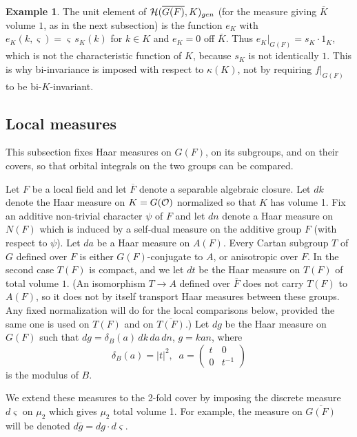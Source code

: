 \documentclass[12pt,letterpaper,openany]{book}
\theoremstyle{plain}
\theoremstyle{definition}
\newtheorem{example}[theorem]{Example}
\theoremstyle{remark}
\theoremstyle{remark}
\begin{document}
\begin{example}
The unit element of ${\cal{H}}(\overline{G(F)},K)_{gen}$ (for the
measure giving $\overline{K}$ volume $1$, as in the next subsection) is
the function $e_K$ with $e_K(k,\varsigma)=\varsigma\, s_K(k)$ for $k\in K$ and
$e_K=0$ off $\overline{K}$. Thus $e_K|_{G(F)}=s_K\cdot 1_K$, which is
not the characteristic function of $K$, because $s_K$ is not identically
$1$. This is why bi-invariance is imposed with respect to
$\kappa(K)$, not by requiring $f|_{G(F)}$ to be bi-$K$-invariant.
\end{example}

\subsection{Local measures}

This subsection fixes Haar measures on $G(F)$, on its subgroups, and on their covers, so that orbital integrals on the two groups can be compared.


Let $F$ be a local field and let $\overline{F}$ denote a separable
algebraic closure.
Let $dk$ denote the Haar measure on $K=G({\cal O})$
normalized so that $K$ has
volume 1. Fix an additive non-trivial character $\psi$ of
$F$ and let $dn$ denote a Haar
measure on $N(F)$ which is induced by a self-dual measure on
the additive group $F$ (with respect to $\psi$).
Let $da$ be a Haar measure on $A(F)$. Every Cartan subgroup $T$ of
$G$ defined over $F$ is either $G(F)$-conjugate to $A$, or anisotropic
over $F$. In the second case $T(F)$ is compact, and we let $dt$ be the
Haar measure on $T(F)$ of total volume $1$. (An isomorphism
$T\rightarrow A$ defined over $\overline{F}$ does not carry $T(F)$ to
$A(F)$, so it does not by itself transport Haar measures between these
groups. Any fixed normalization will do for the local comparisons below, provided
the same one is used on $T(F)$ and on $\overline{T(F)}$.)
Let $dg$ be the Haar measure
on $G(F)$ such that $dg=\delta _B(a)\,dk\,da\,dn$, $g=kan$, where
\begin{equation}
\delta _B(a)=|t|^2,\;\;a=\left(
\begin{array}{cc}
t & 0 \\
0 & t^{-1}
\end{array}
\right)
\end{equation}
is the modulus of $B$.

We extend these measures to the 2-fold cover by imposing the discrete
measure $d\varsigma $ on $\mu _2$ which gives $\mu _2$ total volume 1. For
example, the measure on $\overline{G(F)}$ will be denoted
$d\overline{g}=dg\cdot d\varsigma $.
\end{document}
